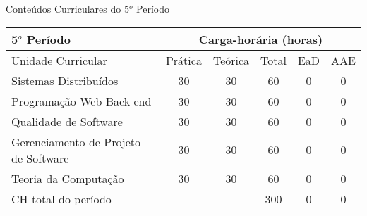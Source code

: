 \begin{quadro}[ht!]
\centering
\caption{Conteúdos Curriculares do 5$^o$ Período}\label{qua:periodo5}
\begin{tabular}{|p{8.0cm}|c|c|c|c|c|}
\hline
\rowcolor{blue1} 5$^o$ Período & \multicolumn{5}{|c|}{\centering Carga-horária (horas)} \\ \hline
\rowcolor{blue1} Unidade Curricular & Prática & Teórica & Total & EaD & AAE \\ \hline
Sistemas Distribuídos & 30 & 30 & 60 & 0	&	0 \\	\hline
Programação Web Back-end & 30 & 30 & 60 & 0	&	0 \\	\hline
Qualidade de Software & 30 & 30 & 60 & 0	&	0 \\	\hline
Gerenciamento de Projeto de Software & 30 & 30 & 60 & 0	&	0 \\	\hline
Teoria da Computação & 30 & 30 & 60 & 0	&	0 \\	\hline
CH total do período & \multicolumn{2}{p{3.3cm}|}{\cellcolor{blue1}} & 300 & 0	&	0 \\ \hline
\end{tabular} \end{quadro}